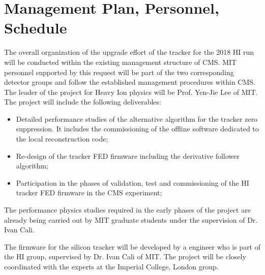 \section{Management Plan, Personnel, Schedule}
\label{sec:management}

The overall organization of the upgrade effort of the tracker%
for the 2018 HI run will be conducted within the existing management structure of CMS. MIT personnel supported by this request will be part of the two corresponding detector groups and follow the established management procedures within CMS. The leader of the project for Heavy Ion physics will be Prof. Yen-Jie Lee of MIT. The project will include the following deliverables:

\begin{itemize}
\item Detailed performance studies of the alternative algorithm for the tracker zero suppression. It includes the commissioning of the offline software dedicated to the local reconstruction code;
\item Re-design of the tracker FED firmware including the derivative follower algorithm;
\item Participation in the phases of validation, test and commissioning of the HI tracker FED firmware in the CMS experiment;
\end{itemize}

The performance physics studies required in the early phases of the project are already being carried out by MIT graduate students under the supervision of Dr. Ivan Cali. 

 
The firmware for the silicon tracker will be developed by a engineer who is part of the HI group,  supervised by Dr. Ivan Cali of MIT. The project will be closely coordinated with the experts at the Imperial College, London group.


